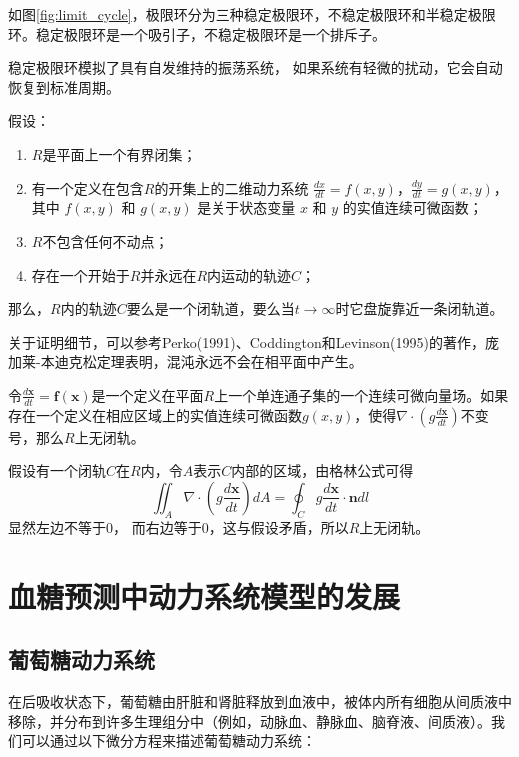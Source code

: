如图\ref{fig:limit_cycle}，极限环分为三种稳定极限环，不稳定极限环和半稳定极限环。稳定极限环是一个吸引子，不稳定极限环是一个排斥子。

稳定极限环模拟了具有自发维持的振荡系统， 如果系统有轻微的扰动，它会自动恢复到标准周期。

\begin{thm}
    假设：
    \begin{enumerate}
        \item $R$是平面上一个有界闭集；
        \item 有一个定义在包含$R$的开集上的二维动力系统 $\frac{dx}{dt} = f(x, y)$，$\frac{dy}{dt} = g(x, y)$，其中 $f(x, y)$ 和 $g(x, y)$ 是关于状态变量 $x$ 和 $y$ 的实值连续可微函数；
        \item $R$不包含任何不动点；
        \item 存在一个开始于$R$并永远在$R$内运动的轨迹$C$；
    \end{enumerate}
    那么，$R$内的轨迹$C$要么是一个闭轨道，要么当$t \to \infty$时它盘旋靠近一条闭轨道。
\end{thm}

关于证明细节，可以参考Perko(1991)、Coddington和Levinson(1995)的著作，庞加莱-本迪克松定理表明，混沌永远不会在相平面中产生\cite{strogatz2018nonlinear}。

\begin{thm}[Dulac准则]
    令$\frac{d\mathbf{x}}{dt}=\mathbf{f}(\mathbf{x})$是一个定义在平面$R$上一个单连通子集的一个连续可微向量场。如果存在一个定义在相应区域上的实值连续可微函数$g(x, y)$，使得$\nabla \cdot (g \frac{d\mathbf{x}}{dt})$不变号，那么$R$上无闭轨。
\end{thm}
\begin{pf}
    假设有一个闭轨$C$在$R$内，令$A$表示$C$内部的区域，由格林公式可得
    \begin{equation}
        \iint_A \nabla \cdot(g \frac{d\mathbf{x}}{dt})dA=\oint_C g \frac{d\mathbf{x}}{dt}\cdot \mathbf{n}dl
    \end{equation}
    显然左边不等于0， 而右边等于0，这与假设矛盾，所以$R$上无闭轨。
\end{pf}

\section{血糖预测中动力系统模型的发展}
\subsection{葡萄糖动力系统}
在后吸收状态下，葡萄糖由肝脏和肾脏释放到血液中，被体内所有细胞从间质液中移除，并分布到许多生理组分中（例如，动脉血、静脉血、脑脊液、间质液）。我们可以通过以下微分方程来描述葡萄糖动力系统\cite{bergman1979quantitative}：

